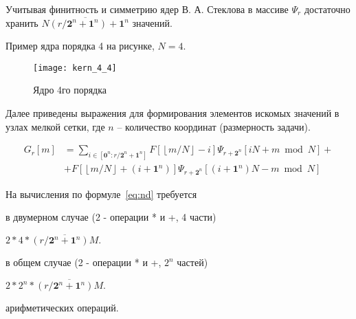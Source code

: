 Учитывая финитность и симметрию ядер В. А. Стеклова
в массиве $\Psi_{r}$ достаточно хранить $\overline{N(r/\mathbf{2}^n + \mathbf{1}^n) +\mathbf{1}^n}$
значений.

Пример ядра порядка 4 на рисунке, $N=4$.

\begin{figure}[h!]
  \centering
  \texttt{[image: kern\_4\_4]} 
  \caption{Ядро 4го порядка}
  \label{fig:reg_net}
\end{figure}
\FloatBarrier




Далее приведены выражения для формирования
элементов искомых значений в узлах мелкой сетки,
где $n$ -- количество координат (размерность задачи).


\begin{equation}
  \label{eq:nd}
  \begin{split}
    G_r[m] &= 
    \sum_{i \in  [\mathbf{0}^n:r/\mathbf{2}^n + \mathbf{1}^n]} 
        F \left[ \left \lfloor {m}/{N} \right \rfloor - i\right]
      \Psi_{r+\mathbf{2}^n}[iN + m\bmod N] 
       + \\
    &  +
      F \left[\left\lfloor m/N \right \rfloor + (i+\mathbf{1}^n)  \right]
      \Psi_{r+\mathbf{2}^n}[(i+\mathbf{1}^n)N - m \bmod N]
  \end{split}
\end{equation}

На вычисления по формуле~\eqref{eq:nd} требуется

в двумерном случае (2 - операции * и +, 4 части)

$2 * 4 * \overline{(r/\mathbf{2}^n+\mathbf{1}^n) M}.$

в общем случае (2 - операции * и +, $2^n$ частей)

$2 * 2^n * \overline{(r/\mathbf{2}^n+\mathbf{1}^n) M}.$

арифметических операций.



